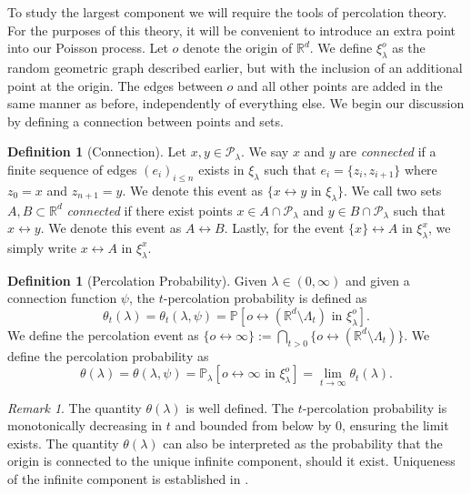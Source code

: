 \documentclass[a4paper,12pt]{scrartcl}
\newcommand{\reals}{\mathbb{R}}
\theoremstyle{definition}
\newtheorem{defi}[theorem]{Definition}
\theoremstyle{remark}
\newtheorem{remark}[theorem]{Remark}
\begin{document}
To study the largest component we will require the tools of percolation theory. For the purposes of this theory, it will be convenient to introduce an extra point into our Poisson process. Let $o$ denote the origin of $\mathbb{R}^d$. We define $\xi_{\lambda}^o$ as the random geometric graph described earlier, but with the inclusion of an additional point at the origin. The edges between $o$ and all other points are added in the same manner as before, independently of everything else. We begin our discussion by defining a connection between points and sets.

\begin{defi}[Connection]
  Let $x, y\in\mathcal{P}_\lambda$. We say $x$ and $y$ are \emph{connected} if a finite sequence of edges $(e_i)_{i\leq n}$ exists in $\xi_\lambda$ such that $e_i = \{z_i, z_{i+1}\}$ where $z_0=x$ and $z_{n+1} = y$. We denote this event as $\{x \leftrightarrow y \text{ in } \xi_{\lambda}\}$.
  We call two sets $A, B \subset \mathbb{R}^d$ \emph{connected} if there exist points $x \in A \cap \mathcal{P}_\lambda$ and $y \in B \cap \mathcal{P}_\lambda$ such that $x \leftrightarrow y$. We denote this event as $A \leftrightarrow B$. Lastly, for the event $\{x\} \leftrightarrow A$ in $\xi_\lambda^x$, we simply write $x \leftrightarrow A$ in $\xi_\lambda^x$.
\end{defi}

\begin{defi}[Percolation Probability]
  Given $\lambda \in (0, \infty)$ and given a connection function $\psi$, the $t$-percolation probability is defined as
  \begin{equation}
    \theta_t(\lambda) = \theta_t(\lambda, \psi) = \mathbb{P}[o \leftrightarrow (\mathbb R^d \setminus \Lambda_t) \text{ in } \xi_{\lambda}^o].
  \end{equation}
  We define the percolation event as $\{o\leftrightarrow \infty\} := \bigcap_{t>0}\{o\leftrightarrow (\mathbb R^d \setminus \Lambda_t)\}$.
  We define the percolation probability as
  \begin{equation}
    \theta(\lambda) = \theta(\lambda, \psi) = \mathbb{P}_{\lambda}[o \leftrightarrow \infty \text{ in } \xi_{\lambda}^o] =
    \lim_{t \to \infty} \theta_t(\lambda).
  \end{equation}
\end{defi}

\begin{remark}
  The quantity $\theta(\lambda)$ is well defined. The $t$-percolation probability is monotonically decreasing in $t$ and bounded from below by $0$, ensuring the limit exists. The quantity $\theta(\lambda)$ can also be interpreted as the probability that the origin is connected to the unique infinite component, should it exist. Uniqueness of the infinite component is established in \cite{meester1996continuum}.
\end{remark}
\end{document}
